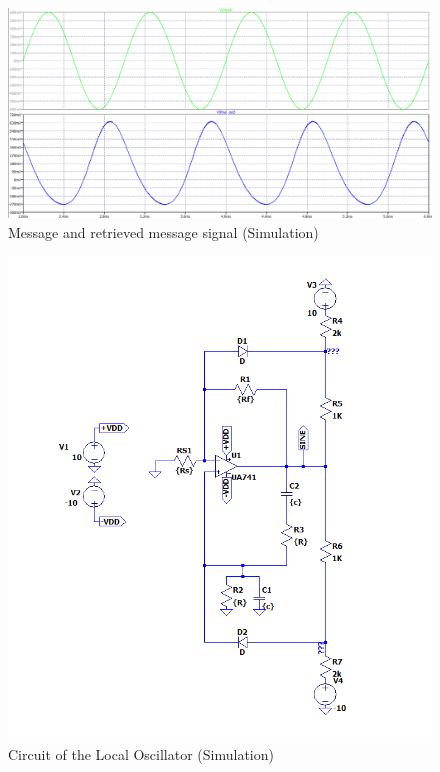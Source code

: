 \documentclass[conference]{IEEEtran}
\begin{document}
\begin{figure}
    \centering
    \includegraphics[width=1\linewidth]{Images/final_out_ltspice.png}
    \caption{Message and retrieved message signal (Simulation)}
\end{figure}

\begin{figure}
    \centering
    \includegraphics[width=1\linewidth]{Images/Wein_bridge_oscillator_ltspice.png}
    \caption{Circuit of the Local Oscillator (Simulation)}
\end{figure}
\end{document}
